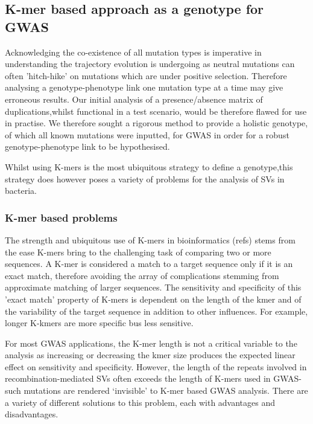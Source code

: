\documentclass{article}
\begin{document}
\subsection{K-mer based approach as a genotype for GWAS}
Acknowledging the co-existence of all mutation types is imperative in understanding the trajectory evolution is undergoing as neutral mutations can often 'hitch-hike' on mutations which are under positive selection. Therefore analysing a genotype-phenotype link one mutation type at a time may give erroneous results. Our initial analysis of a presence/absence matrix of duplications,whilst functional in a test scenario, would be therefore flawed for use in practise. We therefore sought a rigorous method to provide a holistic genotype, of which all known mutations were inputted, for GWAS in order for a robust genotype-phenotype link to be hypothesised. 

Whilst using K-mers is the most ubiquitous strategy to define a genotype,this strategy does however poses a variety of problems for the analysis of SVs in bacteria. 

\subsubsection{K-mer based problems}

The strength and ubiquitous use of K-mers in bioinformatics (refs) stems from the ease K-mers bring to the challenging task of comparing two or more sequences. A K-mer is considered a match to a target sequence only if it is an exact match, therefore avoiding the array of complications stemming from approximate matching of larger sequences. The sensitivity and specificity of this 'exact match' property of K-mers is dependent on the length of the kmer and of the variability of the target sequence in addition to other influences. For example, longer K-kmers are more specific bus less sensitive. 


For most GWAS applications, the K-mer length is not a critical variable to the analysis as increasing or decreasing the kmer size produces the expected linear effect on sensitivity and specificity. However, the length of the repeats involved in recombination-mediated SVs often exceeds the length of K-mers used in GWAS- such mutations are rendered `invisible' to K-mer based GWAS analysis. There are a variety of different solutions to this problem, each with advantages and disadvantages.
\end{document}
